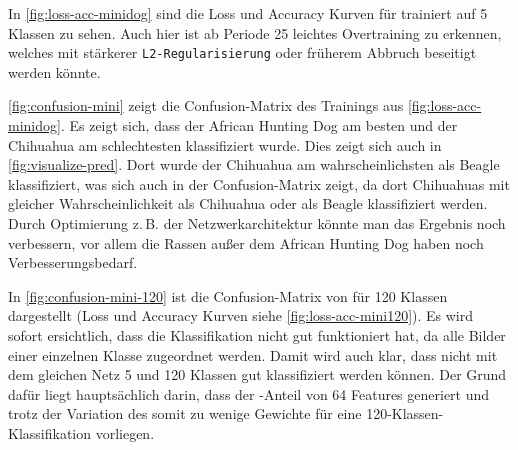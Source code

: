 In \autoref{fig:loss-acc-minidog} sind die Loss und Accuracy Kurven für \MiniDog{}
trainiert auf 5 Klassen zu sehen. Auch hier ist ab Periode 25 leichtes
Overtraining zu erkennen, welches mit stärkerer \texttt{L2-Regularisierung} oder
früherem Abbruch beseitigt werden könnte.

\autoref{fig:confusion-mini} zeigt die Confusion-Matrix des Trainings aus
\autoref{fig:loss-acc-minidog}. Es zeigt sich, dass der African Hunting Dog am
besten und der Chihuahua am schlechtesten klassifiziert wurde. Dies zeigt sich
auch in \autoref{fig:visualize-pred}. Dort wurde der Chihuahua am
wahrscheinlichsten als Beagle klassifiziert, was sich auch in der
Confusion-Matrix zeigt, da dort Chihuahuas mit gleicher Wahrscheinlichkeit als
Chihuahua oder als Beagle klassifiziert werden. Durch Optimierung z.\,B. der
Netzwerkarchitektur könnte man das Ergebnis noch verbessern, vor allem die Rassen
außer dem African Hunting Dog haben noch Verbesserungsbedarf.

In \autoref{fig:confusion-mini-120} ist die Confusion-Matrix von \MiniDog{} für
120 Klassen dargestellt (Loss und Accuracy Kurven siehe
\autoref{fig:loss-acc-mini120}). Es wird sofort ersichtlich, dass die Klassifikation
nicht gut funktioniert hat, da alle Bilder einer einzelnen Klasse zugeordnet
werden. Damit wird auch klar, dass nicht mit dem gleichen Netz 5 und 120 Klassen
gut klassifiziert werden können. Der Grund dafür liegt hauptsächlich darin, dass
der \CNN{}-Anteil von \MiniDog{} 64 Features generiert und trotz der Variation
des \FNC{} somit zu wenige Gewichte für eine 120-Klassen-Klassifikation vorliegen.

